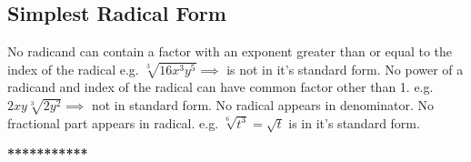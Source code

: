 \subsection{Simplest Radical Form}
No radicand can contain a factor with an exponent greater than or equal to the index of the radical e.g. $ \sqrt[3]{16x^3y^5} \implies $ is not in it's standard form. No power of a radicand and index of the radical can have common factor other than 1. e.g. $ 2xy\sqrt[3]{2y^2} \implies $ not in standard form. No radical appears in denominator. No fractional part appears in radical.
e.g. $ \sqrt[6]{t^3} = \sqrt{t} $ is in it's standard form.

\vspace{5mm}
\begin{center}
\textbf{***********}
\end{center}